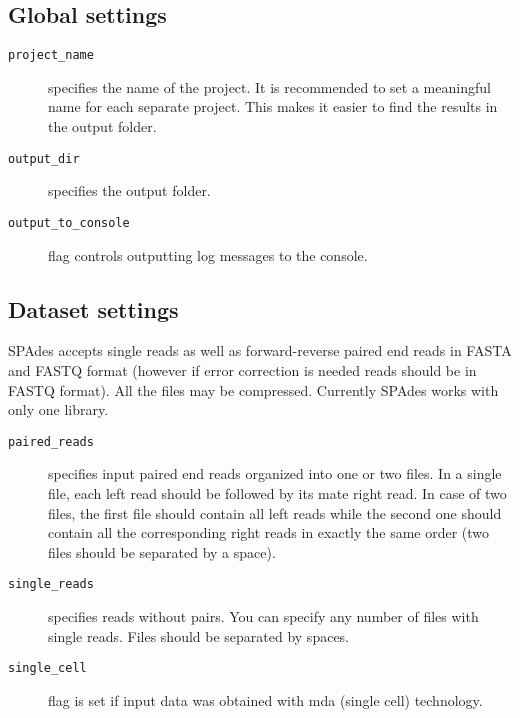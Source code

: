 \documentclass{article}
\def\spades{SPAdes}
\begin{document}
\subsection{Global settings}
\begin{description}
\item[{\tt project\_name}] specifies the name of the project. It is recommended to set a meaningful name for each separate project. This makes it easier to find the results in the output folder.
\item[{\tt output\_dir}] specifies the output folder.
\item[{\tt output\_to\_console}] flag controls outputting log messages to the console.
\end{description}

\subsection{Dataset settings}
{\spades} accepts single reads as well as forward-reverse paired end reads
in FASTA and FASTQ format (however if error correction is needed reads should be in FASTQ format). All the files may be compressed. Currently {\spades} works with only one library.

\begin{description}
\item[{\tt paired\_reads}] specifies input paired end reads organized into one or two files.
In a single file, each left read should be followed by its mate right read. In case of two files, the first file should contain all left reads while the second one should contain all the corresponding right reads in exactly the same order (two files should be separated by a space).
\item[{\tt single\_reads}] specifies reads without pairs. You can specify any number of
files with single reads. Files should be separated by spaces.
\item[{\tt single\_cell}] flag is set if input data was obtained with mda (single cell) technology.
\end{description}
\end{document}
